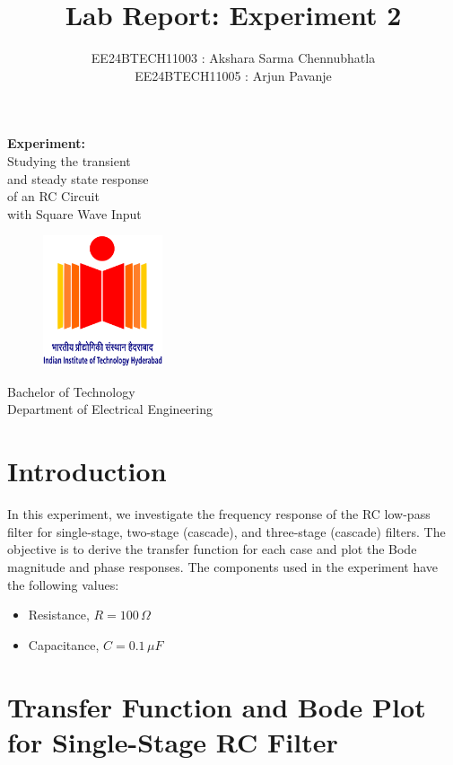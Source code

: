 \documentclass[a4paper,12pt]{article}
\title{\textbf{Lab Report: Experiment 2}}
\author{EE24BTECH11003 : Akshara Sarma Chennubhatla\\EE24BTECH11005 : Arjun Pavanje}
\begin{document}
\maketitle
\begin{center}
	\textbf{Experiment:}\\Studying the transient\\and steady state response\\of an RC Circuit\\with Square Wave Input
\end{center}
\vspace{30pt}
\begin{figure}[h!]
	\centering
	\includegraphics[width = 100pt]{.logo/logo.png}\\
\end{figure}
\begin{center}
	Bachelor of Technology\\
	\vspace{10pt}
	Department of Electrical Engineering\\
\end{center}
\newpage

\section*{Introduction}
In this experiment, we investigate the frequency response of the RC low-pass filter for single-stage, two-stage (cascade), and three-stage (cascade) filters. The objective is to derive the transfer function for each case and plot the Bode magnitude and phase responses. The components used in the experiment have the following values:
\begin{itemize}
    \item Resistance, $ R = 100 \, \Omega $
    \item Capacitance, $ C = 0.1 \, \mu F $
\end{itemize}

\section*{Transfer Function and Bode Plot for Single-Stage RC Filter}
\end{document}
